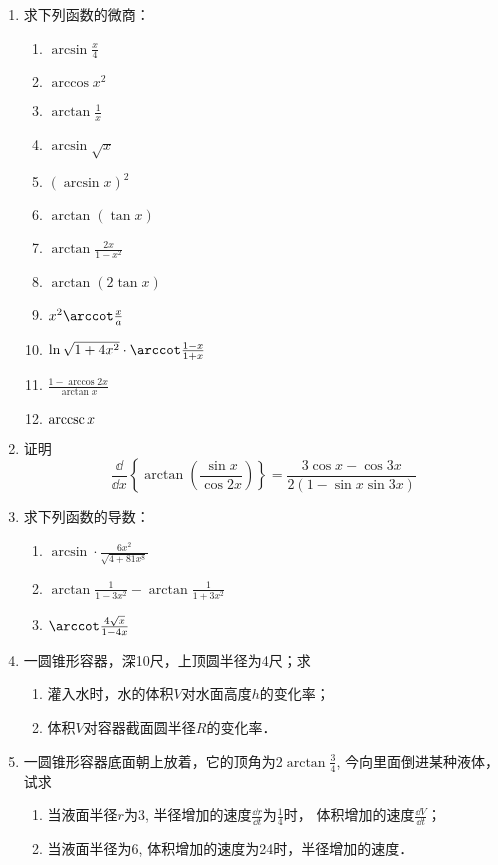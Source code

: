 \begin{ex}
\begin{enumerate}
    \item 求下列函数的微商：
\begin{multicols}{2}
\begin{enumerate}
  \item $\arcsin \frac{x}{4}$
\item  $\arccos x^{2}$
\item  $\arctan \frac{1}{x}$
\item  $\arcsin \sqrt{x}$
\item  $(\arcsin x)^{2}$
\item  $\arctan (\tan  x)$
\item $\arctan \frac{2 x}{1-x^{2}}$
\item  $\arctan (2 \tan  x)$
\item $x^{2} \arccot \frac{x}{a}$
\item $\ln \sqrt{1+4 x^{2}} \cdot \arccot \frac{1-x}{1+x}$
\item  $\frac{1-\arccos 2 x}{\arctan x}$
\item  ${\rm arccsc}\, x$
\end{enumerate}
\end{multicols}

\item 证明
   \[
    \frac{\dd}{\dd x}\left\{\arctan \left(\frac{\sin x}{\cos 2 x}\right)\right\}=\frac{3 \cos x-\cos 3 x}{2(1-\sin x \sin 3 x)}
   \]
    \item 求下列函数的导数：
\begin{enumerate}
\item $\arcsin \cdot \frac{6 x^{2}}{\sqrt{4+81 x^{8}}}$
\item $\arctan \frac{1}{1-3 x^{2}}-\arctan \frac{1}{1+3 x^{2}}$
\item $\arccot \frac{4 \sqrt{x}}{1-4 x}$
\end{enumerate}

\item 一圆锥形容器，深10尺，上顶圆半径为4尺；求
\begin{enumerate}
    \item 灌入水时，水的体积$V$对水面高度$h$的变化率；
    \item 体积$V$对容器截面圆半径$R$的变化率．
\end{enumerate}

\item 一圆锥形容器底面朝上放着，它的顶角为$2\arctan\frac{3}{4}$, 
今向里面倒进某种液体，试求
\begin{enumerate}
\item 当液面半径$r$为3, 半径增加的速度$\frac{\dd r}{\dd t}$为$\frac{1}{4}$时，
体积增加的速度$\frac{\dd V}{\dd t}$；
\item 当液面半径为6, 体积增加的速度为24时，半径增加的速度．
\end{enumerate}


\end{enumerate}
\end{ex}
